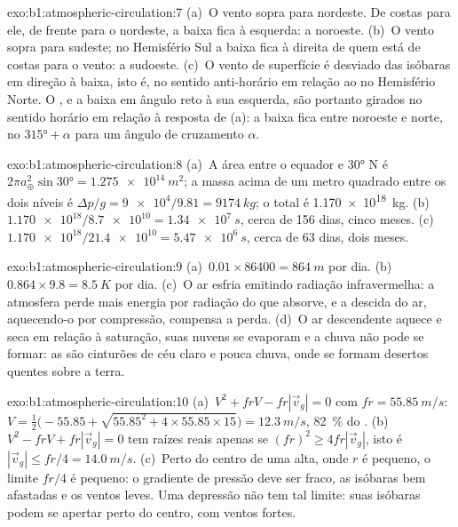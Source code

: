 \begin{solution}{exo:b1:atmospheric-circulation:7}
(a)~O vento sopra para nordeste. De costas para ele, de frente para o nordeste, a baixa fica à
esquerda: a noroeste. (b)~O vento sopra para sudeste; no Hemisfério Sul a baixa fica à direita de quem
está de costas para o vento: a sudoeste. (c)~O vento de superfície é desviado das isóbaras em direção à
baixa, isto é, no sentido anti-horário em relação ao  no Hemisfério Norte. O , e a baixa em ângulo reto à sua esquerda, são portanto girados no sentido horário em
relação à resposta de (a): a baixa fica entre noroeste e norte, no  $\ang{315} + \alpha$ para um
ângulo de cruzamento $\alpha$.
\end{solution}

\begin{solution}{exo:b1:atmospheric-circulation:8}
(a)~A área entre o equador e \ang{30} N é $2\pi a_\oplus^2\sin\ang{30} =
\qty{1.275e14}{m^2}$; a massa acima de um metro quadrado entre os dois níveis é
$\Delta p/g = \num{9e4}/9.81 = \qty{9174}{kg}$; o total é
\qty{1.170e18}{kg}. (b)~$\num{1.170e18}/\num{8.7e10} = \qty{1.34e7}{s}$, cerca de
\num{156} dias, cinco meses. (c)~$\num{1.170e18}/\num{21.4e10} = \qty{5.47e6}{s}$,
cerca de \num{63} dias, dois meses.
\end{solution}

\begin{solution}{exo:b1:atmospheric-circulation:9}
(a)~$\num{0.01} \times \num{86400} = \qty{864}{m}$ por dia. (b)~$0.864 \times 9.8 =
\qty{8.5}{K}$ por dia. (c)~O ar esfria emitindo radiação infravermelha: a atmosfera perde mais energia
por radiação do que absorve, e a descida do ar, aquecendo-o por compressão, compensa a perda.
(d)~O ar descendente aquece e seca em relação à saturação, suas nuvens se evaporam e a chuva não pode
se formar: as  são cinturões de céu claro e pouca chuva, onde se formam desertos
quentes sobre a terra.
\end{solution}

\begin{solution}{exo:b1:atmospheric-circulation:10}
(a)~$V^2 + frV - fr|\vec v_g| = 0$ com $fr = \qty{55.85}{m/s}$:
$V = \tfrac12\bigl(-55.85 + \sqrt{55.85^2 + 4 \times 55.85 \times 15}\bigr) =
\qty{12.3}{m/s}$, \qty{82}{\percent} do . (b)~$V^2 - frV +
fr|\vec v_g| = 0$ tem raízes reais apenas se $(fr)^2 \geq 4fr|\vec v_g|$, isto é
$|\vec v_g| \leq fr/4 = \qty{14.0}{m/s}$. (c)~Perto do centro de uma alta, onde $r$ é
pequeno, o limite $fr/4$ é pequeno: o gradiente de pressão deve ser fraco, as isóbaras bem
afastadas e os ventos leves. Uma depressão não tem tal limite: suas isóbaras podem se apertar
perto do centro, com ventos fortes.
\end{solution}

